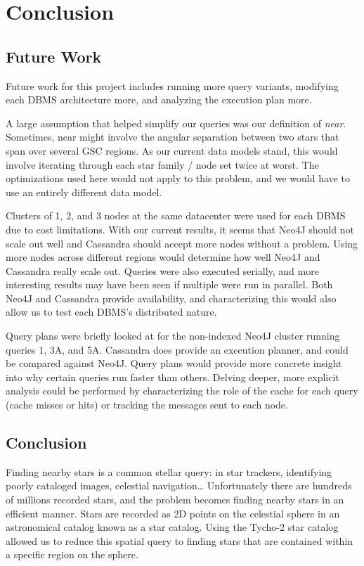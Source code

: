\section{Conclusion}\label{sec:conclusion}
\subsection{Future Work}\label{subsec:futureWork}
Future work for this project includes running more query variants, modifying each DBMS architecture more, and
analyzing the execution plan more.

A large assumption that helped simplify our queries was our definition of \textit{near}.
Sometimes, near might involve the angular separation between two stars that span over several GSC regions.
As our current data models stand, this would involve iterating through each star family / node set twice at worst.
The optimizations used here would not apply to this problem, and we would have to use an entirely different data
model.
 
Clusters of 1, 2, and 3 nodes at the same datacenter were used for each DBMS due to cost limitations.
With our current results, it seems that Neo4J should not scale out well and Cassandra should accept more nodes without
a problem.
Using more nodes across different regions would determine how well Neo4J and Cassandra really scale out.
Queries were also executed serially, and more interesting results may have been seen if multiple were run in parallel.
Both Neo4J and Cassandra provide availability, and characterizing this would also allow us to test each DBMS's
distributed nature.

Query plans were briefly looked at for the non-indexed Neo4J cluster running queries 1, 3A, and 5A\@.
Cassandra does provide an execution planner, and could be compared against Neo4J\@.
Query plans would provide more concrete insight into why certain queries run faster than others.
Delving deeper, more explicit analysis could be performed by characterizing the role of the cache for each query 
(cache misses or hits) or tracking the messages sent to each node. 

\subsection{Conclusion}\label{subsec:conclusion}
Finding nearby stars is a common stellar query: in star trackers, identifying poorly cataloged images, celestial
navigation\ldots
Unfortunately there are hundreds of millions recorded stars, and the problem becomes finding nearby stars in an
efficient manner.
Stars are recorded as 2D points on the celestial sphere in an astronomical catalog known as a star catalog.
Using the Tycho-2 star catalog allowed us to reduce this spatial query to finding stars that are contained
within a specific region on the sphere.

